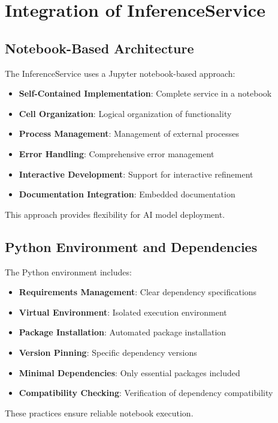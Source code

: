 \section{Integration of InferenceService}

\subsection{Notebook-Based Architecture}
The InferenceService uses a Jupyter notebook-based approach:
\begin{itemize}
    \item \textbf{Self-Contained Implementation}: Complete service in a notebook
    \item \textbf{Cell Organization}: Logical organization of functionality
    \item \textbf{Process Management}: Management of external processes
    \item \textbf{Error Handling}: Comprehensive error management
    \item \textbf{Interactive Development}: Support for interactive refinement
    \item \textbf{Documentation Integration}: Embedded documentation
\end{itemize}

This approach provides flexibility for AI model deployment.

\subsection{Python Environment and Dependencies}
The Python environment includes:
\begin{itemize}
    \item \textbf{Requirements Management}: Clear dependency specifications
    \item \textbf{Virtual Environment}: Isolated execution environment
    \item \textbf{Package Installation}: Automated package installation
    \item \textbf{Version Pinning}: Specific dependency versions
    \item \textbf{Minimal Dependencies}: Only essential packages included
    \item \textbf{Compatibility Checking}: Verification of dependency compatibility
\end{itemize}

These practices ensure reliable notebook execution.

